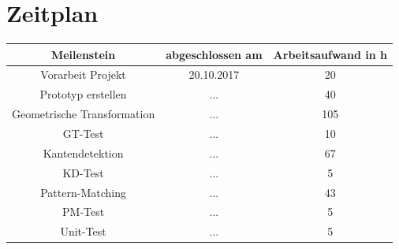 \documentclass[deutsch]{scrartcl}
\begin{document}
\section{Zeitplan}
\begin{table}[h!]
	\centering
		\begin{tabular}{|c|c|c|}
		\hline
		Meilenstein & abgeschlossen am & Arbeitsaufwand in h\\
		\hline
		Vorarbeit Projekt & 20.10.2017 & 20\\
		Prototyp erstellen& ... & 40\\
		Geometrische Transformation& ... & 105 \\
		GT-Test & ... & 10 \\
		Kantendetektion& ... & 67 \\
		KD-Test & ... & 5 \\
		Pattern-Matching & ... & 43\\
		PM-Test & ... & 5 \\
		Unit-Test & ... & 5 \\
		\hline
		\end{tabular}
\end{table}
\nocite{*}

{}
\end{document}
